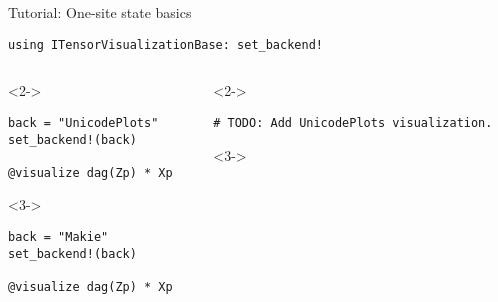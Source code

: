 \begin{frame}[fragile]{Tutorial: One-site state basics}

\begin{lstlisting}[language=JuliaLocal, style=julia, basicstyle=\small]
using ITensorVisualizationBase: set_backend!
\end{lstlisting}

\begin{columns}

\begin{column}{4.5cm}

\begin{onlyenv}<2->

\begin{lstlisting}[language=JuliaLocal, style=julia, basicstyle=\small]
back = "UnicodePlots"
set_backend!(back)

@visualize dag(Zp) * Xp
\end{lstlisting}

\end{onlyenv}

\begin{onlyenv}<3->

\begin{lstlisting}[language=JuliaLocal, style=julia, basicstyle=\small]
back = "Makie"
set_backend!(back)

@visualize dag(Zp) * Xp
\end{lstlisting}

\end{onlyenv}

\end{column}

\begin{column}{4.5cm}

\begin{onlyenv}<2->

\begin{lstlisting}[style=julia, numbers=none, mathescape, basicstyle=\small]
# TODO: Add UnicodePlots visualization.
\end{lstlisting}

\end{onlyenv}

\begin{onlyenv}<3->


\end{onlyenv}

\end{column}

\end{columns}

\end{frame}
